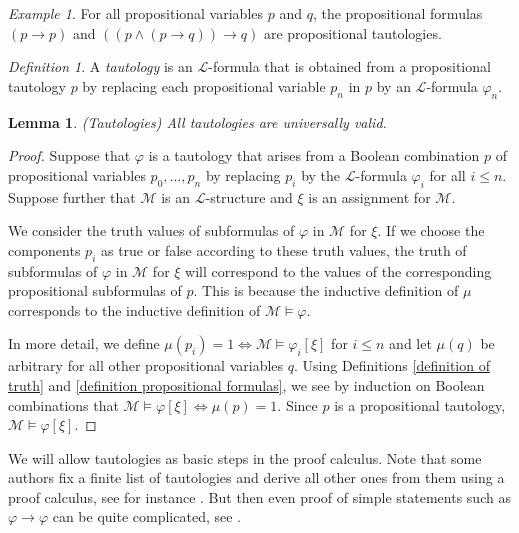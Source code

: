 \documentclass[a4paper, 11pt]{amsart}
\newtheorem{lemma}[lemma]{Lemma}
\theoremstyle{remark}
\newtheorem{definition}[definition]{Definition}
\newtheorem{example}[example]{Example}
\newcommand{\cL}{\mathcal L}
\newcommand{\cM}{\mathcal M}
\begin{document}

\begin{example} 
For all propositional variables $p$ and $q$, the propositional formulas 
$(p\rightarrow p)$ and $((p\wedge (p\rightarrow q)) \rightarrow q)$ are propositional tautologies. 
\end{example} 

\begin{definition} 
A \emph{tautology} is an $\cL$-formula that is obtained from a propositional tautology $p$ by replacing each propositional variable $p_n$ in $p$ by an $\cL$-formula $\varphi_n$. 
\end{definition} 

\begin{lemma}(Tautologies) 
All tautologies are universally valid. 
\end{lemma} 
\begin{proof} 
Suppose that $\varphi$ is a tautology that arises from a Boolean combination $p$ of propositional variables $p_0,\dots, p_n$ by replacing $p_i$ by the $\cL$-formula $\varphi_i$ for all $i\leq n$. 
Suppose further that $\cM$ is an $\cL$-structure and $\xi$ is an assignment for $\cM$. 

We consider the truth values of subformulas of $\varphi$ in $\cM$ for $\xi$. 
If we choose the components $p_i$ as true or false according to these truth values, the truth of subformulas of $\varphi$ in $\cM$ for $\xi$ will correspond to the values of the corresponding propositional subformulas of $p$. 
This is because the inductive definition of $\mu$ corresponds to the inductive definition of $\cM\models \varphi$. 

In more detail, we define $\mu(p_i)=1 \Longleftrightarrow \cM \models \varphi_i[\xi]$ for $i\leq n$ and let $\mu(q)$ be arbitrary for all other propositional variables $q$. 
Using Definitions \ref{definition of truth} and \ref{definition propositional formulas}, we see by induction on  Boolean combinations that $\cM\models \varphi[\xi] \Longleftrightarrow \mu(p)=1$. 
Since $p$ is a propositional tautology, $\cM\models \varphi[\xi]$. 
\end{proof} 

We will allow tautologies as basic steps in the proof calculus. 
Note that some authors fix a finite list of tautologies and derive all other ones from them using a proof calculus, see for instance \cite[Page 11]{halbeisengodel}. But then even proof of simple statements such as $\varphi\rightarrow \varphi$ can be quite complicated, see \cite[Page 14]{halbeisengodel}. 
\end{document}

